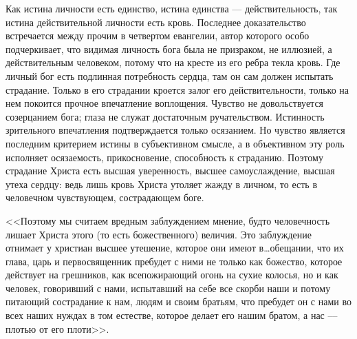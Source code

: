 \documentclass[12pt,oneside]{book}
\begin{document}
Как истина личности есть единство, истина единства --- действительность, так истина действительной личности есть кровь. Последнее доказательство встречается между прочим в четвертом евангелии, автор которого особо подчеркивает, что видимая личность бога была не призраком, не иллюзией, а действительным человеком, потому что на кресте из его ребра текла кровь. Где личный бог есть подлинная потребность сердца, там он сам должен испытать страдание. Только в его страдании кроется залог его действительности, только на нем покоится прочное впечатление воплощения. Чувство не довольствуется созерцанием бога; глаза не служат достаточным ручательством. Истинность зрительного впечатления подтверждается только осязанием. Но чувство является последним критерием истины в субъективном смысле, а в объективном эту роль исполняет осязаемость, прикосновение, способность к страданию. Поэтому страдание Христа есть высшая уверенность, высшее самоуслаждение, высшая утеха сердцу: ведь лишь кровь Христа утоляет жажду в личном, то есть в человечном чувствующем, сострадающем боге.

<<Поэтому мы считаем вредным заблуждением мнение, будто человечность лишает Христа этого (то есть божественного) величия. Это заблуждение отнимает у христиан высшее утешение, которое они имеют в\dots обещании, что их глава, царь и первосвященник пребудет с ними не только как божество, которое действует на грешников, как всепожирающий огонь на сухие колосья, но и как человек, говоривший с нами, испытавший на себе все скорби наши и потому питающий сострадание к нам, людям и своим братьям, что пребудет он с нами во всех наших нуждах в том естестве, которое делает его нашим братом, а нас --– плотью от его плоти>>\dag\let\svthefootnote\thefootnote\let\thefootnote\relax{}\let\thefootnote\svthefootnote.
\end{document}
